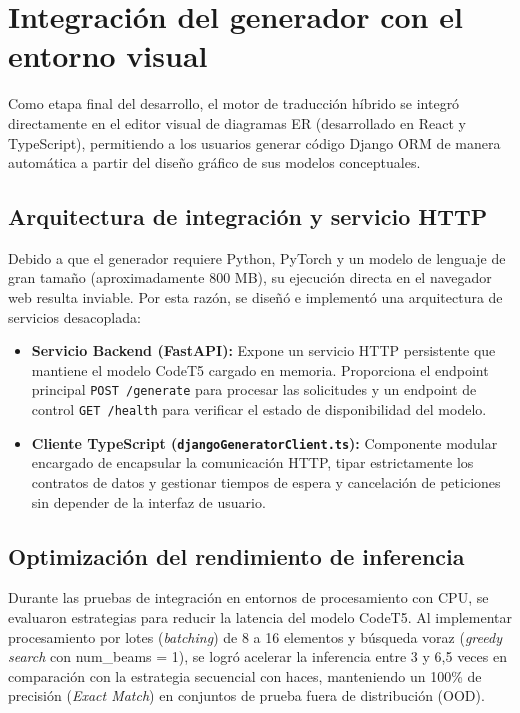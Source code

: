\newpage
\section{Integración del generador con el entorno visual}
\label{sec:tercer-prototipo}

Como etapa final del desarrollo, el motor de traducción híbrido se integró directamente en el editor visual de diagramas ER (desarrollado en React y TypeScript), permitiendo a los usuarios generar código Django ORM de manera automática a partir del diseño gráfico de sus modelos conceptuales.

\subsection{Arquitectura de integración y servicio HTTP}
\label{subsec:p3-arquitectura-servicio}

Debido a que el generador requiere Python, PyTorch y un modelo de lenguaje de gran tamaño (aproximadamente 800 MB), su ejecución directa en el navegador web resulta inviable. Por esta razón, se diseñó e implementó una arquitectura de servicios desacoplada:
\begin{itemize}
    \item \textbf{Servicio Backend (FastAPI):} Expone un servicio HTTP persistente que mantiene el modelo CodeT5 cargado en memoria. Proporciona el endpoint principal \texttt{POST /generate} para procesar las solicitudes y un endpoint de control \texttt{GET /health} para verificar el estado de disponibilidad del modelo.
    \item \textbf{Cliente TypeScript (\texttt{djangoGeneratorClient.ts}):} Componente modular encargado de encapsular la comunicación HTTP, tipar estrictamente los contratos de datos y gestionar tiempos de espera y cancelación de peticiones sin depender de la interfaz de usuario.
\end{itemize}

\subsection{Optimización del rendimiento de inferencia}
\label{subsec:p3-optimizacion}

Durante las pruebas de integración en entornos de procesamiento con CPU, se evaluaron estrategias para reducir la latencia del modelo CodeT5. Al implementar procesamiento por lotes (\textit{batching}) de 8 a 16 elementos y búsqueda voraz (\textit{greedy search} con num\_beams = 1), se logró acelerar la inferencia entre 3 y 6,5 veces en comparación con la estrategia secuencial con haces, manteniendo un 100\% de precisión (\textit{Exact Match}) en conjuntos de prueba fuera de distribución (OOD).

